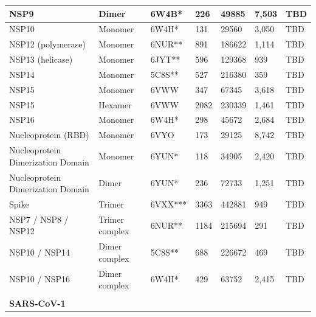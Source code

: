 \documentclass[../main.tex]{subfiles}
\begin{document}
\begin{table}[]
{\begin{tabular}{|l|l|p{2.5cm}|l|l|l|p{2.5cm}|}
                NSP9                              & Dimer          & 6W4B*   & 226  & 49885  & 7,503  & TBD \\ \hline
                NSP10                             & Monomer        & 6W4H*   & 131  & 29560  & 3,050  & TBD \\ \hline
                NSP12 (polymerase)                & Monomer        & 6NUR**  & 891  & 186622 & 1,114  & TBD \\ \hline
                NSP13 (helicase)                  & Monomer        & 6JYT**  & 596  & 129368 & 939    & TBD \\ \hline
                NSP14                             & Monomer        & 5C8S**  & 527  & 216380 & 359    & TBD \\ \hline
                NSP15                             & Monomer        & 6VWW    & 347  & 67345  & 3,618  & TBD \\ \hline
                NSP15                             & Hexamer        & 6VWW    & 2082 & 230339 & 1,461  & TBD \\ \hline
                NSP16                             & Monomer        & 6W4H*   & 298  & 45672  & 2,684  & TBD \\ \hline
                Nucleoprotein (RBD)               & Monomer        & 6VYO    & 173  & 29125  & 8,742  & TBD \\ \hline
                Nucleoprotein Dimerization Domain & Monomer        & 6YUN*   & 118  & 34905  & 2,420  & TBD \\ \hline
                Nucleoprotein Dimerization Domain & Dimer          & 6YUN*   & 236  & 72733  & 1,251  & TBD \\ \hline
                Spike                             & Trimer         & 6VXX*** & 3363 & 442881 & 949    & TBD \\ \hline
                NSP7 / NSP8 / NSP12               & Trimer complex & 6NUR**  & 1184 & 215694 & 291    & TBD \\ \hline
                NSP10 / NSP14                     & Dimer complex  & 5C8S**  & 688  & 226672 & 469    & TBD \\ \hline
                NSP10 / NSP16                     & Dimer complex  & 6W4H*   & 429  & 63752  & 2,415  & TBD \\ \hline
                                                  &                &         &      &        &        &     \\ \hline
                \textbf{SARS-CoV-1}               &                &         &      &        &        &     \\ \hline

\end{tabular}}
\end{table}
\end{document}
